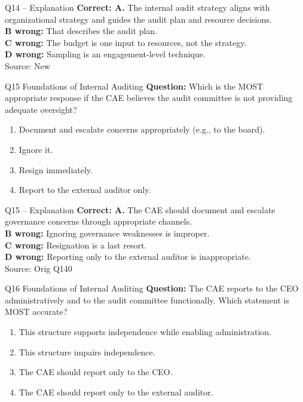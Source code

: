 \documentclass[aspectratio=169,10pt]{beamer}
\begin{document}
\begin{frame}[t]{Q14 -- Explanation}
	\footnotesize
	\textbf{Correct: A.} The internal audit strategy aligns with organizational strategy and guides the audit plan and resource decisions. \\[5pt]
\textbf{B wrong:} That describes the audit plan. \\[3pt]
\textbf{C wrong:} The budget is one input to resources, not the strategy. \\[3pt]
\textbf{D wrong:} Sampling is an engagement-level technique. \\[3pt]
	\vfill {\tiny Source: New}
\end{frame}

\begin{frame}[t]{Q15 \hfill {\scriptsize Foundations of Internal Auditing}}
	\small
	\textbf{Question:} Which is the MOST appropriate response if the CAE believes the audit committee is not providing adequate oversight?
	\begin{enumerate}[label=\Alph*.,itemsep=1pt,topsep=3pt]
			\item Document and escalate concerns appropriately (e.g., to the board).
			\item Ignore it.
			\item Resign immediately.
			\item Report to the external auditor only.
	\end{enumerate}
\end{frame}

\begin{frame}[t]{Q15 -- Explanation}
	\footnotesize
	\textbf{Correct: A.} The CAE should document and escalate governance concerns through appropriate channels. \\[5pt]
\textbf{B wrong:} Ignoring governance weaknesses is improper. \\[3pt]
\textbf{C wrong:} Resignation is a last resort. \\[3pt]
\textbf{D wrong:} Reporting only to the external auditor is inappropriate. \\[3pt]
	\vfill {\tiny Source: Orig Q140}
\end{frame}

\begin{frame}[t]{Q16 \hfill {\scriptsize Foundations of Internal Auditing}}
	\small
	\textbf{Question:} The CAE reports to the CEO administratively and to the audit committee functionally. Which statement is MOST accurate?
	\begin{enumerate}[label=\Alph*.,itemsep=1pt,topsep=3pt]
			\item This structure supports independence while enabling administration.
			\item This structure impairs independence.
			\item The CAE should report only to the CEO.
			\item The CAE should report only to the external auditor.
	\end{enumerate}
\end{frame}
\end{document}
